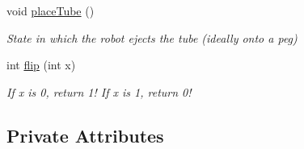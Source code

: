 \begin{DoxyCompactItemize}
void \hyperlink{class_r_j_f_r_c2011_1_1_autonomous_ac2f9296b723f0f862c40f39a3d10dda2}{placeTube} ()
\begin{DoxyCompactList}\small\item\em State in which the robot ejects the tube (ideally onto a peg) \item\end{DoxyCompactList}\item 
int \hyperlink{class_r_j_f_r_c2011_1_1_autonomous_ab6638dfef78f4513be78e517df1c0ca0}{flip} (int x)
\begin{DoxyCompactList}\small\item\em If x is 0, return 1! If x is 1, return 0! \item\end{DoxyCompactList}\end{DoxyCompactItemize}
\subsection*{Private Attributes}
